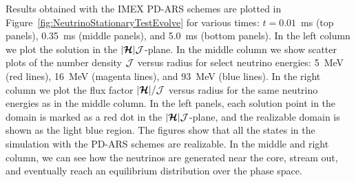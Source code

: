 Results obtained with the IMEX PD-ARS schemes are plotted in Figure~\ref{fig:NeutrinoStationaryTestEvolve} for various times: $t=0.01$~ms (top panels), 0.35~ms (middle panels), and 5.0~ms (bottom panels).  
In the left column we plot the solution in the $|\boldsymbol{\mathcal{H}}|\mathcal{J}$-plane.  
In the middle column we show scatter plots of the number density $\mathcal{J}$ versus radius for select neutrino energies: 5~MeV (red lines), 16~MeV (magenta lines), and $93$~MeV (blue lines).  
In the right column we plot the flux factor $|\boldsymbol{\mathcal{H}}|/\mathcal{J}$ versus radius for the same neutrino energies as in the middle column. 
In the left panels, each solution point in the domain is marked as a red dot in the $|\boldsymbol{\mathcal{H}}|\mathcal{J}$-plane, and the realizable domain is shown as the light blue region.  
The figures show that all the states in the simulation with the PD-ARS schemes are realizable.
In the middle and right column, we can see how the neutrinos are generated near the core, stream out, and eventually reach an equilibrium distribution over the phase space.

